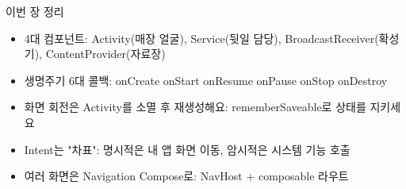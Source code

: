 \begin{tcbsummary}{이번 장 정리}
\begin{itemize}
  \item 4대 컴포넌트: Activity(매장 얼굴), Service(뒷일 담당), BroadcastReceiver(확성기), ContentProvider(자료장)
  \item 생명주기 6대 콜백: onCreate onStart onResume onPause onStop onDestroy
  \item 화면 회전은 Activity를 소멸 후 재생성해요: rememberSaveable로 상태를 지키세요
  \item Intent는 "차표": 명시적은 내 앱 화면 이동, 암시적은 시스템 기능 호출
  \item 여러 화면은 Navigation Compose로: NavHost + composable 라우트
\end{itemize}

\end{tcbsummary}
